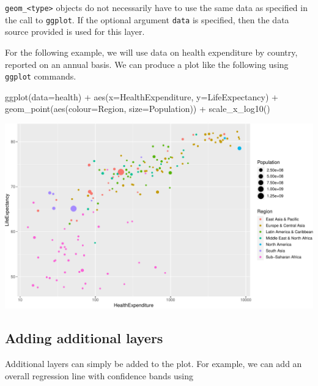 \documentclass[
]{book}
\newenvironment{Shaded}{\begin{snugshade}}{\end{snugshade}}
\newcommand{\AttributeTok}[1]{\textcolor[rgb]{0.77,0.63,0.00}{#1}}
\newcommand{\FunctionTok}[1]{\textcolor[rgb]{0.00,0.00,0.00}{#1}}
\newcommand{\NormalTok}[1]{#1}
\newcommand{\SpecialCharTok}[1]{\textcolor[rgb]{0.00,0.00,0.00}{#1}}
\begin{document}
\texttt{geom\_\textless{}type\textgreater{}} objects do not necessarily have to use the same data as specified in the call to \texttt{ggplot}. If the optional argument \texttt{data} is specified, then the data source provided is used for this layer.

For the following example, we will use data on health expenditure by country, reported on an annual basis. We can produce a plot like the following using \texttt{ggplot} commands.

\begin{Shaded}
\begin{Highlighting}[]
\FunctionTok{ggplot}\NormalTok{(}\AttributeTok{data=}\NormalTok{health) }\SpecialCharTok{+} 
  \FunctionTok{aes}\NormalTok{(}\AttributeTok{x=}\NormalTok{HealthExpenditure,  }\AttributeTok{y=}\NormalTok{LifeExpectancy) }\SpecialCharTok{+}
  \FunctionTok{geom\_point}\NormalTok{(}\FunctionTok{aes}\NormalTok{(}\AttributeTok{colour=}\NormalTok{Region, }\AttributeTok{size=}\NormalTok{Population)) }\SpecialCharTok{+}
  \FunctionTok{scale\_x\_log10}\NormalTok{()}
\end{Highlighting}
\end{Shaded}

\includegraphics[width=\textwidth]{bookdown-demo_files/figure-latex/unnamed-chunk-53-1}

\hypertarget{adding-additional-layers}{%
\subsection{Adding additional layers}\label{adding-additional-layers}}

Additional layers can simply be added to the plot. For example, we can add an overall regression line with confidence bands using
\end{document}
